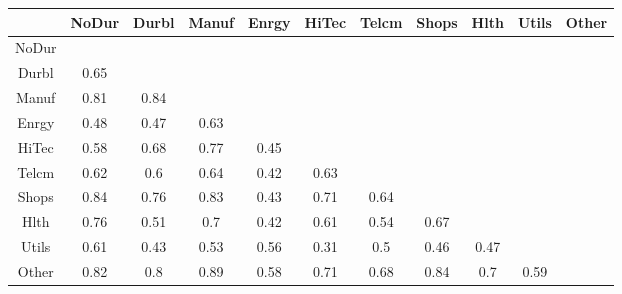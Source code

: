 \begin{tabular}{ccccccccccc}
  \hline
 & NoDur & Durbl & Manuf & Enrgy & HiTec & Telcm & Shops & Hlth & Utils & Other \\ 
  \hline
NoDur &  &  &  &  &  &  &  &  &  &  \\ 
  Durbl & 0.65 &  &  &  &  &  &  &  &  &  \\ 
  Manuf & 0.81 & 0.84 &  &  &  &  &  &  &  &  \\ 
  Enrgy & 0.48 & 0.47 & 0.63 &  &  &  &  &  &  &  \\ 
  HiTec & 0.58 & 0.68 & 0.77 & 0.45 &  &  &  &  &  &  \\ 
  Telcm & 0.62 & 0.6 & 0.64 & 0.42 & 0.63 &  &  &  &  &  \\ 
  Shops & 0.84 & 0.76 & 0.83 & 0.43 & 0.71 & 0.64 &  &  &  &  \\ 
  Hlth & 0.76 & 0.51 & 0.7 & 0.42 & 0.61 & 0.54 & 0.67 &  &  &  \\ 
  Utils & 0.61 & 0.43 & 0.53 & 0.56 & 0.31 & 0.5 & 0.46 & 0.47 &  &  \\ 
  Other & 0.82 & 0.8 & 0.89 & 0.58 & 0.71 & 0.68 & 0.84 & 0.7 & 0.59 &  \\ 
   \hline
\end{tabular}
